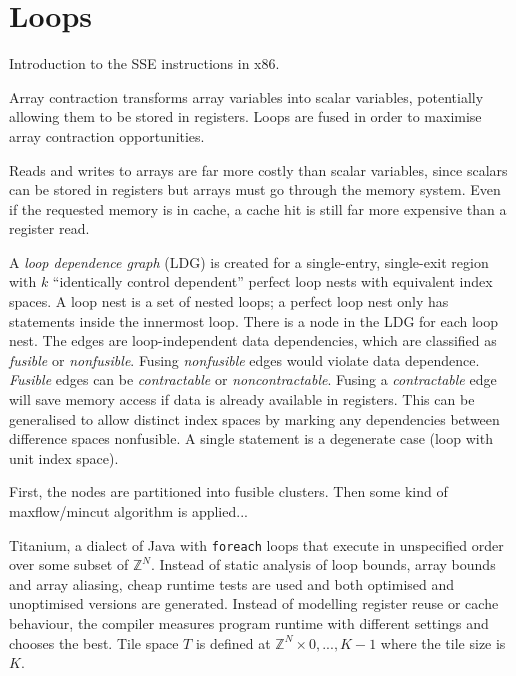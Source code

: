 \section{Loops}

Introduction to the SSE instructions in x86.

Array contraction transforms array variables into scalar variables,
potentially allowing them to be stored in registers.
Loops are fused in order to maximise array contraction opportunities.

Reads and writes to arrays are far more costly than scalar variables, since
scalars can be stored in registers but arrays must go through the memory system.
Even if the requested memory is in cache, a cache hit is still far more expensive than a register read.

A \emph{loop dependence graph} (LDG) is created for a single-entry, single-exit region with $k$ ``identically control dependent'' perfect loop nests with equivalent index spaces.
A loop nest is a set of nested loops; a perfect loop nest only has statements inside the innermost loop.
There is a node in the LDG for each loop nest.
The edges are loop-independent data dependencies, which are classified as \emph{fusible} or \emph{nonfusible}.
Fusing \emph{nonfusible} edges would violate data dependence. \emph{Fusible} edges can be \emph{contractable} or \emph{noncontractable}.
Fusing a \emph{contractable} edge will save memory access if data is already available in registers.
This can be generalised to allow distinct index spaces by marking any dependencies between difference spaces nonfusible. A single statement is a degenerate case (loop with unit index space).

First, the nodes are partitioned into fusible clusters. Then some kind of maxflow/mincut algorithm is applied...


Titanium, a dialect of Java with {\tt foreach} loops that execute in unspecified order over some subset of $\mathbb{Z}^N$.
Instead of static analysis of loop bounds, array bounds and array aliasing, cheap runtime tests are used
and both optimised and unoptimised versions are generated.
Instead of modelling register reuse or cache behaviour, the compiler measures program runtime with different settings and chooses the best.
Tile space $T$ is defined at $\mathbb{Z}^N \times {0, ... , K - 1}$ where the tile size is $K$.

